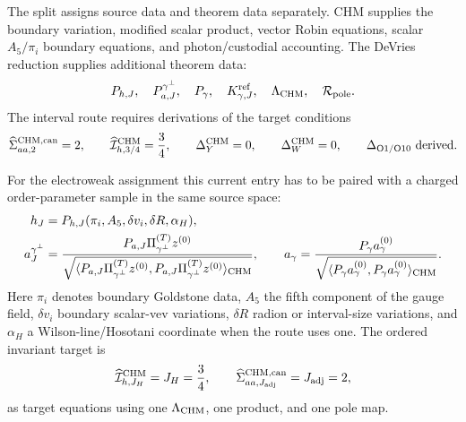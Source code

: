 \begin{widetext}
The split assigns source data and theorem data separately.  CHM supplies the
boundary variation, modified scalar product, vector Robin equations, scalar
\(A_5/\pi_i\) boundary equations, and photon/custodial accounting.  The
DeVries reduction supplies additional theorem data:
\[
  P_{h,J},\quad P_{a,J}^{\gamma^\perp},\quad P_\gamma,\quad
  K_{\gamma,J}^{\rm ref},\quad \Lambda_{\rm CHM},\quad
  \mathcal R_{\rm pole}.
\]
The interval route requires derivations of the target conditions
\[
  \widehat\Sigma_{aa,2}^{\rm CHM,can}=2,\qquad
  \widehat{\mathcal I}_{h,3/4}^{\rm CHM}=\frac34,\qquad
  \Delta_Y^{\rm CHM}=0,\qquad
  \Delta_W^{\rm CHM}=0,\qquad
  \Delta_{\rm O1/O10}\ \hbox{derived}.
\]

For the electroweak assignment this current entry has to be paired with a
charged order-parameter sample in the same source space:
\begin{align}
  h_J&=
  P_{h,J}(\pi_i,A_5,\delta v_i,\delta R,\alpha_H),
  \label{eq:chm-h-sample}\\
  a_J^{\gamma^\perp}&=
  \frac{P_{a,J}\Pi_{\gamma^\perp}^{(T)}z^{(0)}}
  {\sqrt{\langle P_{a,J}\Pi_{\gamma^\perp}^{(T)}z^{(0)},
  P_{a,J}\Pi_{\gamma^\perp}^{(T)}z^{(0)}\rangle_{\rm CHM}}},
  \qquad
  a_\gamma=
  \frac{P_\gamma a_\gamma^{(0)}}
  {\sqrt{\langle P_\gamma a_\gamma^{(0)},
  P_\gamma a_\gamma^{(0)}\rangle_{\rm CHM}}}.
  \label{eq:chm-a-gamma-samples}
\end{align}
Here \(\pi_i\) denotes boundary Goldstone data, \(A_5\) the fifth component of
the gauge field, \(\delta v_i\) boundary scalar-vev variations, \(\delta R\)
radion or interval-size variations, and \(\alpha_H\) a Wilson-line/Hosotani
coordinate when the route uses one.  The ordered invariant target is
\begin{equation}
  \widehat{\mathcal I}_{h,J_H}^{\rm CHM}=J_H=\frac34,
  \qquad
  \widehat\Sigma_{aa,J_{\rm adj}}^{\rm CHM,can}=J_{\rm adj}=2,
  \label{eq:chm-ordered-invariant-target}
\end{equation}
as target equations using one \(\Lambda_{\rm CHM}\), one product, and one pole
map.


\end{widetext}
